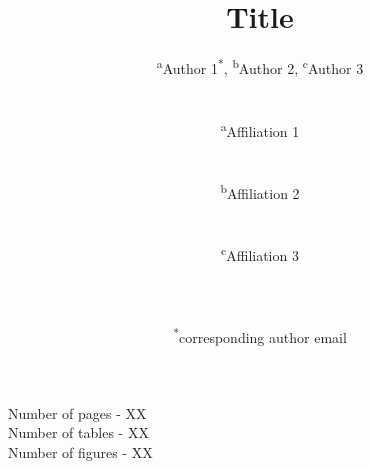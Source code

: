 \documentclass[11pt,a4paper]{article}
\begin{document}
\begin{titlepage}
    \title{Title}
    \author{
        \textsuperscript{a}Author 1\textsuperscript{*}, 
        \textsuperscript{b}Author 2, 
        \textsuperscript{c}Author 3
        \\ \\ \\
        \textsuperscript{a}Affiliation 1\\ 
        \\ \\
        \textsuperscript{b}Affiliation 2\\ 
        \\ \\
        \textsuperscript{c}Affiliation 3\\
        \\ \\ \\
        \textsuperscript{*}corresponding author email
    }
\clearpage %
\maketitle
\vspace*{\fill}
\begin{flushright}{
        \noindent Number of pages - XX \\
        \noindent Number of tables - XX \\
        \noindent Number of figures - XX
}
\end{flushright}
\thispagestyle{empty} %
\end{titlepage}
\end{document}
